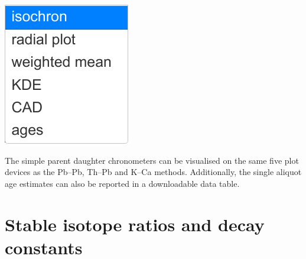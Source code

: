 \begin{refsection}
\noindent\begin{minipage}[t]{.15\linewidth}
\strut\vspace*{-\baselineskip}\newline
\includegraphics[width=\linewidth]{../figures/PbPbPlotdevices.png}\\
\end{minipage}
\begin{minipage}[t]{.85\textwidth}
  The simple parent daughter chronometers can be visualised on the
  same five plot devices as the Pb--Pb, Th--Pb and K--Ca methods.
  Additionally, the single aliquot age estimates can also be reported
  in a downloadable data table.
\end{minipage}

\section{Stable isotope ratios and decay constants}\label{sec:PD-Lambda}


\end{refsection}
